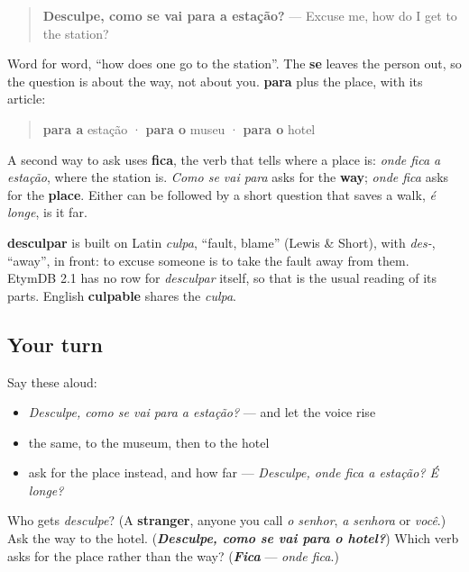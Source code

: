 \begin{grammarlens}[title={Grammar Lens: como se vai para…?}]
\begin{quote}
\textbf{Desculpe, como se vai para a estação?} — Excuse me, how do I get to the station?
\end{quote}

Word for word, \textquotedblleft{}how does one go to the station\textquotedblright{}. The \textbf{se} leaves the person out, so the question is about the way, not about you. \textbf{para} plus the place, with its article:

\begin{quote}
\textbf{para a} estação · \textbf{para o} museu · \textbf{para o} hotel
\end{quote}

A second way to ask uses \textbf{fica}, the verb that tells where a place is: \emph{onde fica a estação}, where the station is. \emph{Como se vai para} asks for the \textbf{way}; \emph{onde fica} asks for the \textbf{place}. Either can be followed by a short question that saves a walk, \emph{é longe}, is it far.
\end{grammarlens}

\begin{cousinweb}
\textbf{desculpar} is built on Latin \emph{culpa}, \textquotedblleft{}fault, blame\textquotedblright{} (Lewis \& Short), with \emph{des-}, \textquotedblleft{}away\textquotedblright{}, in front: to excuse someone is to take the fault away from them. EtymDB 2.1 has no row for \emph{desculpar} itself, so that is the usual reading of its parts. English \textbf{culpable} shares the \emph{culpa}.
\end{cousinweb}

\subsection*{Your turn}
Say these aloud:

\begin{itemize}
\raggedright
  \item \emph{Desculpe, como se vai para a estação?} — and let the voice rise
  \item the same, to the museum, then to the hotel
  \item ask for the place instead, and how far — \emph{Desculpe, onde fica a estação? É longe?}
\end{itemize}

\begin{tcolorbox}[breakable,colback=teal!4,colframe=teal!35!black,title={Before you move on}]
Who gets \emph{desculpe}? (A \textbf{stranger}, anyone you call \emph{o senhor}, \emph{a senhora} or \emph{você}.) Ask the way to the hotel. (\emph{\textbf{Desculpe, como se vai para o hotel?}}) Which verb asks for the place rather than the way? (\emph{\textbf{Fica}} — \emph{onde fica}.)
\end{tcolorbox}
